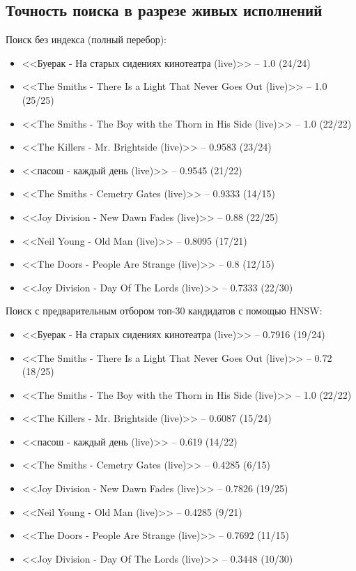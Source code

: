 \subsection{Точность поиска в разрезе живых исполнений}
Поиск без индекса (полный перебор):
\begin{itemize}
    \item <<Буерак - На старых сидениях кинотеатра (live)>> -- 1.0 (24/24)
    \item <<The Smiths - There Is a Light That Never Goes Out (live)>> -- 1.0 (25/25)
    \item <<The Smiths - The Boy with the Thorn in His Side (live)>> -- 1.0 (22/22)
    \item <<The Killers - Mr. Brightside (live)>> -- 0.9583 (23/24)
    \item <<пасош - каждый день (live)>> -- 0.9545 (21/22)
    \item <<The Smiths - Cemetry Gates (live)>> -- 0.9333 (14/15)
    \item <<Joy Division - New Dawn Fades (live)>> -- 0.88 (22/25)
    \item <<Neil Young - Old Man (live)>> -- 0.8095 (17/21)
    \item <<The Doors - People Are Strange (live)>> -- 0.8 (12/15)
    \item <<Joy Division - Day Of The Lords (live)>> -- 0.7333 (22/30)
\end{itemize}

Поиск с предварительным отбором топ-30 кандидатов с помощью HNSW:
\begin{itemize}
    \item <<Буерак - На старых сидениях кинотеатра (live)>> -- 0.7916 (19/24)
    \item <<The Smiths - There Is a Light That Never Goes Out (live)>> -- 0.72 (18/25)
    \item <<The Smiths - The Boy with the Thorn in His Side (live)>> -- 1.0 (22/22)
    \item <<The Killers - Mr. Brightside (live)>> -- 0.6087 (15/24)
    \item <<пасош - каждый день (live)>> -- 0.619 (14/22)
    \item <<The Smiths - Cemetry Gates (live)>> -- 0.4285 (6/15)
    \item <<Joy Division - New Dawn Fades (live)>> -- 0.7826 (19/25)
    \item <<Neil Young - Old Man (live)>> -- 0.4285 (9/21)
    \item <<The Doors - People Are Strange (live)>> -- 0.7692 (11/15)
    \item <<Joy Division - Day Of The Lords (live)>> -- 0.3448 (10/30)
\end{itemize}

